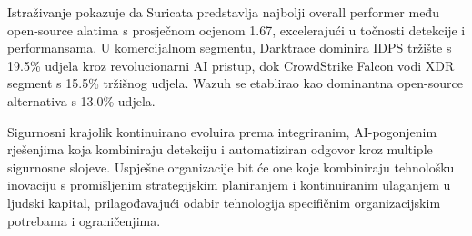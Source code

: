 \documentclass[utf8, seminar]{fer}
\begin{document}
Istraživanje pokazuje da Suricata predstavlja najbolji overall performer među open-source alatima s prosječnom ocjenom 1.67, excelerajući u točnosti detekcije i performansama. U komercijalnom segmentu, Darktrace dominira IDPS tržište s 19.5\% udjela kroz revolucionarni AI pristup, dok CrowdStrike Falcon vodi XDR segment s 15.5\% tržišnog udjela. Wazuh se etablirao kao dominantna open-source alternativa s 13.0\% udjela.

Sigurnosni krajolik kontinuirano evoluira prema integriranim, AI-pogonjenim rješenjima koja kombiniraju detekciju i automatiziran odgovor kroz multiple sigurnosne slojeve. Uspješne organizacije bit će one koje kombiniraju tehnološku inovaciju s promišljenim strategijskim planiranjem i kontinuiranim ulaganjem u ljudski kapital, prilagođavajući odabir tehnologija specifičnim organizacijskim potrebama i ograničenjima.


\end{document}
